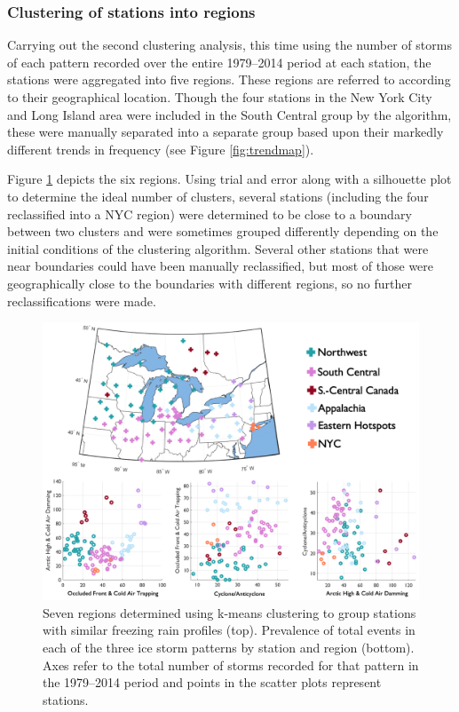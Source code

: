 \documentclass[twocol]{ametsoc}
\begin{document}
\subsubsection{Clustering of stations into regions}
Carrying out the second clustering analysis, this time using the number of storms of each pattern recorded over the entire 1979--2014 period at each station, the stations were aggregated into five regions. These regions are referred to according to their geographical location. Though the four stations in the New York City and Long Island area were included in the South Central group by the algorithm, these were manually separated into a separate group based upon their markedly different trends in frequency (see Figure \ref{fig:trendmap}). 

Figure \ref{fig:regional_breakdown} depicts the six regions. Using trial and error along with a silhouette plot to determine the ideal number of clusters, several stations (including the four reclassified into a NYC region) were determined to be close to a boundary between two clusters and were sometimes grouped differently depending on the initial conditions of the clustering algorithm. Several other stations that were near boundaries could have been manually reclassified, but most of those were geographically close to the boundaries with different regions, so no further reclassifications were made. 

\begin{figure}
\centering
\includegraphics[width=1\textwidth]{regional_Breakdown.png}
\caption{\label{fig:regional_breakdown} Seven regions determined using k-means clustering to group stations with similar freezing rain profiles (top). Prevalence of total events in each of the three ice storm patterns by station and region (bottom). Axes refer to the total number of storms recorded for that pattern in the 1979--2014 period and points in the scatter plots represent stations.}
\end{figure}
\end{document}
